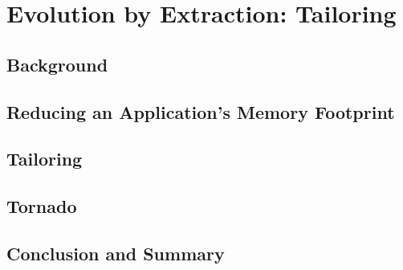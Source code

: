 
\chapter{Evolution by Extraction: Tailoring}
\minitoc
\introduction


\section{Background}

\section{Reducing an Application's Memory Footprint}

\section{Tailoring}

\section{Tornado}

\section{Conclusion and Summary}

